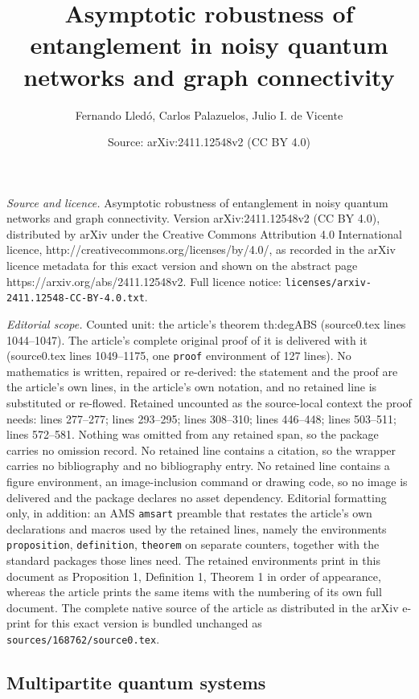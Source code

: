 \documentclass[10pt,a4paper]{amsart}
\title{Asymptotic robustness of entanglement in noisy quantum networks and graph connectivity}
\author{Fernando Lled\'o, Carlos Palazuelos, Julio I. de Vicente}
\date{Source: arXiv:2411.12548v2 (CC BY 4.0)}
\begin{document}
\maketitle

\noindent\emph{Source and licence.} Asymptotic robustness of entanglement in noisy quantum networks and graph connectivity. Version arXiv:2411.12548v2 (CC BY 4.0), distributed by arXiv under the Creative Commons Attribution 4.0 International licence, http://creativecommons.org/licenses/by/4.0/, as recorded in the arXiv licence metadata for this exact version and shown on the abstract page https://arxiv.org/abs/2411.12548v2. Full licence notice: \texttt{licenses/arxiv-2411.12548-CC-BY-4.0.txt}.\par\smallskip

\noindent\textit{Editorial scope.} Counted unit: the article's theorem th:degABS (source0.tex lines 1044--1047). The article's complete original proof of it is delivered with it (source0.tex lines 1049--1175, one \texttt{proof} environment of 127 lines). No mathematics is written, repaired or re-derived: the statement and the proof are the article's own lines, in the article's own notation, and no retained line is substituted or re-flowed.  Retained uncounted as the source-local context the proof needs: lines 277--277; lines 293--295; lines 308--310; lines 446--448; lines 503--511; lines 572--581.  Nothing was omitted from any retained span, so the package carries no omission record.  No retained line contains a citation, so the wrapper carries no bibliography and no bibliography entry.  No retained line contains a figure environment, an image-inclusion command or drawing code, so no image is delivered and the package declares no asset dependency.  Editorial formatting only, in addition: an AMS \texttt{amsart} preamble that restates the article's own declarations and macros used by the retained lines, namely the environments \texttt{proposition}, \texttt{definition}, \texttt{theorem} on separate counters, together with the standard packages those lines need.  The retained environments print in this document as Proposition 1, Definition 1, Theorem 1 in order of appearance, whereas the article prints the same items with the numbering of its own full document.  The complete native source of the article as distributed in the arXiv e-print for this exact version is bundled unchanged as \texttt{sources/168762/source0.tex}.
\subsection{Multipartite quantum systems}\label{sec21}
\end{document}
